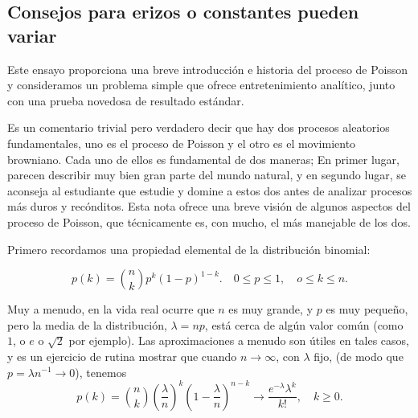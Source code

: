 \subsection{Consejos para erizos o constantes pueden variar}

	Este ensayo proporciona una breve introducción e historia del proceso de Poisson y consideramos un problema simple que ofrece entretenimiento analítico, junto con una prueba novedosa de resultado estándar.

	Es un comentario trivial pero verdadero decir que hay dos procesos aleatorios fundamentales, uno es el proceso de Poisson y el otro es el movimiento browniano. Cada uno de ellos es fundamental de dos maneras; En primer lugar, parecen describir muy bien gran parte del mundo natural, y en segundo lugar, se aconseja al estudiante que estudie y domine a estos dos antes de analizar procesos más duros y recónditos. Esta nota ofrece una breve visión de algunos aspectos del proceso de Poisson, que técnicamente es, con mucho, el más manejable de los dos.

	Primero recordamos una propiedad elemental de la distribución binomial:

	\[
		p\left(k\right)=\binom{n}{k}p^{k}{\left(1-p\right)}^{1-k}.\quad 0\le p\le 1,\quad o\le k\le n.
	\]

	Muy a menudo, en la vida real ocurre que $n$ es muy grande, y $p$ es muy pequeño, pero la media de la distribución, $\lambda=np$, está cerca de algún valor común (como $1$, o $e$ o $\sqrt{2}$ por ejemplo). Las aproximaciones a menudo son útiles en tales casos, y es un ejercicio de rutina mostrar que cuando $n\to\infty$, con $\lambda$ fijo, (de modo que $p=\lambda n^{-1}\to0$), tenemos
	\begin{equation}\label{eq:1}
		p\left(k\right)=\binom{n}{k}{\left(\frac{\lambda}{n}\right)}^{k}{\left(1-\frac{\lambda}{n}\right)}^{n-k}\to\frac{e^{-\lambda}\lambda^{k}}{k!},\quad k\ge 0.
	\end{equation}

